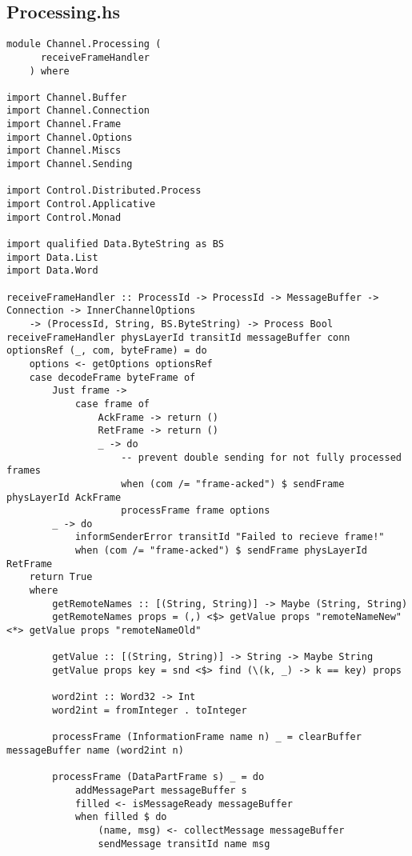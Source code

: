 \documentclass[russian,utf8,simple,emptystyle]{eskdtext}
\begin{document}
\subsection{Processing.hs}
\begin{lstlisting}
module Channel.Processing (
      receiveFrameHandler
    ) where

import Channel.Buffer
import Channel.Connection
import Channel.Frame 
import Channel.Options
import Channel.Miscs
import Channel.Sending

import Control.Distributed.Process 
import Control.Applicative
import Control.Monad 

import qualified Data.ByteString as BS
import Data.List
import Data.Word 

receiveFrameHandler :: ProcessId -> ProcessId -> MessageBuffer -> Connection -> InnerChannelOptions 
    -> (ProcessId, String, BS.ByteString) -> Process Bool 
receiveFrameHandler physLayerId transitId messageBuffer conn optionsRef (_, com, byteFrame) = do 
    options <- getOptions optionsRef
    case decodeFrame byteFrame of 
        Just frame ->
            case frame of 
                AckFrame -> return ()
                RetFrame -> return ()
                _ -> do 
                    -- prevent double sending for not fully processed frames
                    when (com /= "frame-acked") $ sendFrame physLayerId AckFrame 
                    processFrame frame options
        _ -> do 
            informSenderError transitId "Failed to recieve frame!"
            when (com /= "frame-acked") $ sendFrame physLayerId RetFrame
    return True
    where 
        getRemoteNames :: [(String, String)] -> Maybe (String, String)
        getRemoteNames props = (,) <$> getValue props "remoteNameNew" <*> getValue props "remoteNameOld"

        getValue :: [(String, String)] -> String -> Maybe String 
        getValue props key = snd <$> find (\(k, _) -> k == key) props

        word2int :: Word32 -> Int 
        word2int = fromInteger . toInteger

        processFrame (InformationFrame name n) _ = clearBuffer messageBuffer name (word2int n)
        
        processFrame (DataPartFrame s) _ = do 
            addMessagePart messageBuffer s 
            filled <- isMessageReady messageBuffer
            when filled $ do  
                (name, msg) <- collectMessage messageBuffer
                sendMessage transitId name msg


\end{lstlisting}
\end{document}
